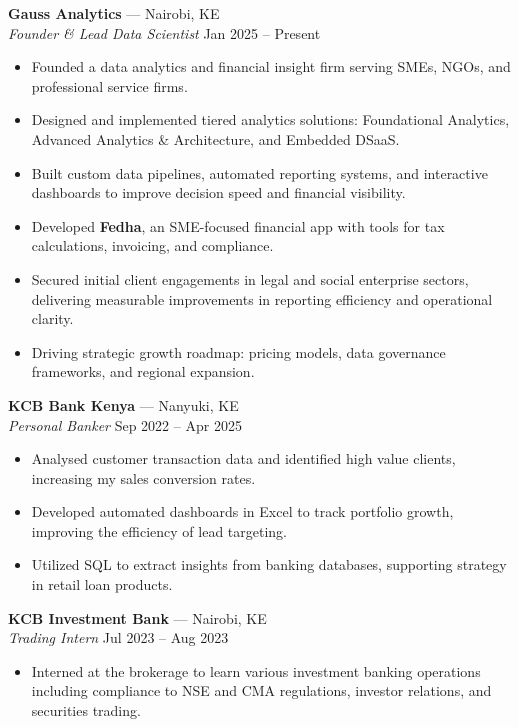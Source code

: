 \documentclass[11pt,a4paper]{article}
\begin{document}
\textbf{Gauss Analytics} — Nairobi, KE \\
\textit{Founder \& Lead Data Scientist} \hfill Jan 2025 – Present
\begin{itemize}[leftmargin=*]
    \item Founded a data analytics and financial insight firm serving SMEs, NGOs, and professional service firms.
    \item Designed and implemented tiered analytics solutions: Foundational Analytics, Advanced Analytics \& Architecture, and Embedded DSaaS.
    \item Built custom data pipelines, automated reporting systems, and interactive dashboards to improve decision speed and financial visibility.
    \item Developed \textbf{Fedha}, an SME-focused financial app with tools for tax calculations, invoicing, and compliance.
    \item Secured initial client engagements in legal and social enterprise sectors, delivering measurable improvements in reporting efficiency and operational clarity.
    \item Driving strategic growth roadmap: pricing models, data governance frameworks, and regional expansion.
\end{itemize}

\textbf{KCB Bank Kenya} — Nanyuki, KE \\
\textit{Personal Banker} \hfill Sep 2022 – Apr 2025
\begin{itemize}[leftmargin=*]
    \item Analysed customer transaction data and identified high value clients, increasing my sales conversion rates.
    \item Developed automated dashboards in Excel to track portfolio growth, improving the efficiency of lead targeting.
    \item Utilized SQL to extract insights from banking databases, supporting strategy in retail loan products.
\end{itemize}

\textbf{KCB Investment Bank} — Nairobi, KE \\
\textit{Trading Intern} \hfill Jul 2023 – Aug 2023
\begin{itemize}[leftmargin=*]
    \item Interned at the brokerage to learn various investment banking operations including compliance to NSE and CMA regulations, investor relations, and securities trading.
\end{itemize}
\end{document}
